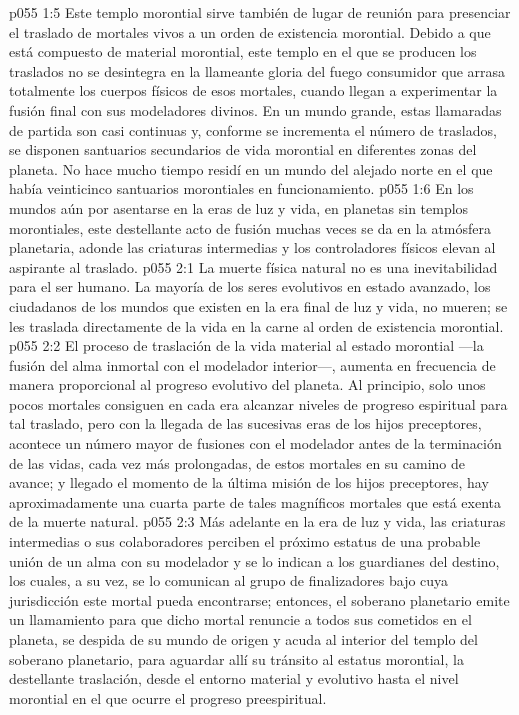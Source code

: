 \vs p055 1:5 Este templo morontial sirve también de lugar de reunión para presenciar el traslado de mortales vivos a un orden de existencia morontial. Debido a que está compuesto de material morontial, este templo en el que se producen los traslados no se desintegra en la llameante gloria del fuego consumidor que arrasa totalmente los cuerpos físicos de esos mortales, cuando llegan a experimentar la fusión final con sus modeladores divinos. En un mundo grande, estas llamaradas de partida son casi continuas y, conforme se incrementa el número de traslados, se disponen santuarios secundarios de vida morontial en diferentes zonas del planeta. No hace mucho tiempo residí en un mundo del alejado norte en el que había veinticinco santuarios morontiales en funcionamiento.
\vs p055 1:6 \pc En los mundos aún por asentarse en la eras de luz y vida, en planetas sin templos morontiales, este destellante acto de fusión muchas veces se da en la atmósfera planetaria, adonde las criaturas intermedias y los controladores físicos elevan al aspirante al traslado.
\vs p055 2:1 La muerte física natural no es una inevitabilidad para el ser humano. La mayoría de los seres evolutivos en estado avanzado, los ciudadanos de los mundos que existen en la era final de luz y vida, no mueren; se les traslada directamente de la vida en la carne al orden de existencia morontial.
\vs p055 2:2 El proceso de traslación de la vida material al estado morontial ---la fusión del alma inmortal con el modelador interior---, aumenta en frecuencia de manera proporcional al progreso evolutivo del planeta. Al principio, solo unos pocos mortales consiguen en cada era alcanzar niveles de progreso espiritual para tal traslado, pero con la llegada de las sucesivas eras de los hijos preceptores, acontece un número mayor de fusiones con el modelador antes de la terminación de las vidas, cada vez más prolongadas, de estos mortales en su camino de avance; y llegado el momento de la última misión de los hijos preceptores, hay aproximadamente una cuarta parte de tales magníficos mortales que está exenta de la muerte natural.
\vs p055 2:3 \pc Más adelante en la era de luz y vida, las criaturas intermedias o sus colaboradores perciben el próximo estatus de una probable unión de un alma con su modelador y se lo indican a los guardianes del destino, los cuales, a su vez, se lo comunican al grupo de finalizadores bajo cuya jurisdicción este mortal pueda encontrarse; entonces, el soberano planetario emite un llamamiento para que dicho mortal renuncie a todos sus cometidos en el planeta, se despida de su mundo de origen y acuda al interior del templo del soberano planetario, para aguardar allí su tránsito al estatus morontial, la destellante traslación, desde el entorno material y evolutivo hasta el nivel morontial en el que ocurre el progreso preespiritual.

